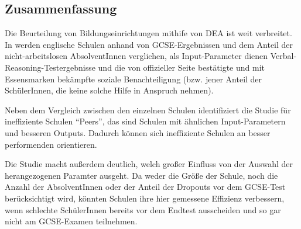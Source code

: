 \subsection{Zusammenfassung}
Die Beurteilung von Bildungseinrichtungen mithife von DEA ist weit verbreitet.
In \cite{thanassoulis_guiding_1994} werden englische Schulen anhand von GCSE-Ergebnissen und dem Anteil der nicht-arbeitslosen AbsolventInnen verglichen, als Input-Parameter dienen Verbal-Reasoning-Testergebnisse und die von offizieller Seite bestätigte und mit Essensmarken bekämpfte soziale Benachteiligung (bzw. jener Anteil der SchülerInnen, die keine solche Hilfe in Anspruch nehmen).

Neben dem Vergleich zwischen den einzelnen Schulen identifiziert die Studie für ineffiziente Schulen "`Peers"', das sind Schulen mit ähnlichen Input-Parametern und besseren Outputs.
Dadurch können sich ineffiziente Schulen an besser performenden orientieren.

Die Studie macht außerdem deutlich, welch großer Einfluss von der Auswahl der herangezogenen Paramter ausgeht.
Da weder die Größe der Schule, noch die Anzahl der AbsolventInnen oder der Anteil der Dropouts vor dem GCSE-Test berücksichtigt wird, könnten Schulen ihre hier gemessene Effizienz verbessern, wenn schlechte SchülerInnen bereits vor dem Endtest ausscheiden und so gar nicht am GCSE-Examen teilnehmen.
